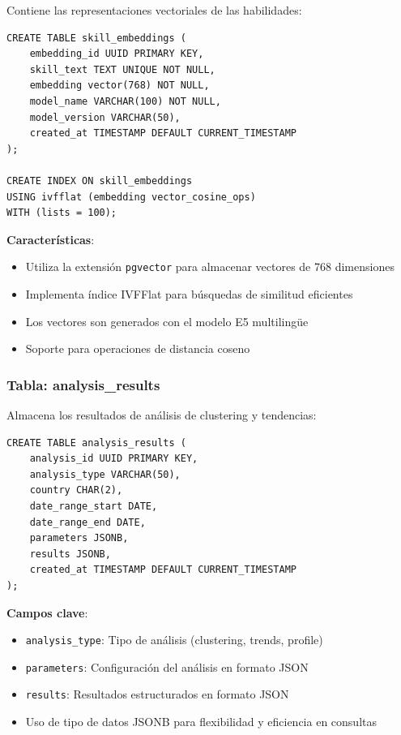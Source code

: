 Contiene las representaciones vectoriales de las habilidades:

\begin{verbatim}
CREATE TABLE skill_embeddings (
    embedding_id UUID PRIMARY KEY,
    skill_text TEXT UNIQUE NOT NULL,
    embedding vector(768) NOT NULL,
    model_name VARCHAR(100) NOT NULL,
    model_version VARCHAR(50),
    created_at TIMESTAMP DEFAULT CURRENT_TIMESTAMP
);

CREATE INDEX ON skill_embeddings
USING ivfflat (embedding vector_cosine_ops)
WITH (lists = 100);
\end{verbatim}

\textbf{Características}:
\begin{itemize}
    \item Utiliza la extensión \texttt{pgvector} para almacenar vectores de 768 dimensiones
    \item Implementa índice IVFFlat para búsquedas de similitud eficientes
    \item Los vectores son generados con el modelo E5 multilingüe
    \item Soporte para operaciones de distancia coseno
\end{itemize}

\subsubsection{Tabla: analysis\_results}

Almacena los resultados de análisis de clustering y tendencias:

\begin{verbatim}
CREATE TABLE analysis_results (
    analysis_id UUID PRIMARY KEY,
    analysis_type VARCHAR(50),
    country CHAR(2),
    date_range_start DATE,
    date_range_end DATE,
    parameters JSONB,
    results JSONB,
    created_at TIMESTAMP DEFAULT CURRENT_TIMESTAMP
);
\end{verbatim}

\textbf{Campos clave}:
\begin{itemize}
    \item \texttt{analysis\_type}: Tipo de análisis (clustering, trends, profile)
    \item \texttt{parameters}: Configuración del análisis en formato JSON
    \item \texttt{results}: Resultados estructurados en formato JSON
    \item Uso de tipo de datos JSONB para flexibilidad y eficiencia en consultas
\end{itemize}

